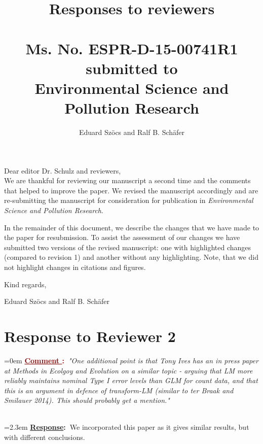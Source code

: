 \documentclass[12pt]{article}
\newcounter{cN}
\newcommand{\comment}[1]{
	\vspace{2em} 
	\refstepcounter{cN} %
	\noindent \hangindent=0em \textbf{\textcolor{Maroon}{\uline{Comment \thecN}:~}}\emph{"#1"}
	}
\newcommand{\response}[1]{
	\\[0.25em] 
	\hangindent=2.3em \textbf{\textcolor{NavyBlue}{\uline{Response}:~}}#1 
	}
\begin{document}
\title{Responses to reviewers\\~\\Ms. No. ESPR-D-15-00741R1\\submitted to\\Environmental Science and Pollution Research}

\author{Eduard Szöcs and Ralf B. Schäfer}

\maketitle
\noindent Dear editor Dr. Schulz  and reviewers,\\

We are thankful for reviewing our manuscript a second time and the comments that helped to improve the paper. 
We revised the manuscript accordingly and are re-submitting the manuscript for consideration for publication in \emph{Environmental Science and Pollution Research}. 

In the remainder of this document, we describe the changes that we have made to the paper for resubmission. 
To assist the assessment of our changes we have submitted two versions of the revised manuscript: one with highlighted changes (compared to revision 1) and another without any highlighting. 
Note, that we did not highlight changes in citations and figures.


\vspace{2em}
\hfill Kind regards,

\hfill Eduard Szöcs and Ralf B. Schäfer
\newpage








\section{Response to Reviewer 2}
\vspace{-2em}

\comment{One additional point is that Tony Ives has an in press paper at Methods in Ecolgoy and Evolution on a similar topic - arguing that LM more reliably maintains nominal Type I error levels than GLM for count data, and that this is an argument in defence of transform-LM (similar to ter Braak and Smilauer 2014). This should probably get a mention.}
\response{We incorporated this paper as it gives similar results, but with different conclusions. \todo{noch machen!}}
\end{document}

